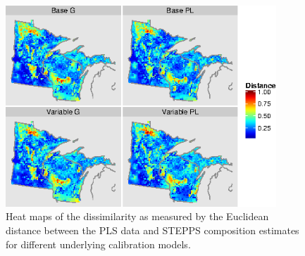 \begin{figure}
\centering
\includegraphics[width=4in]{figures/maps_l2.png}
\caption{Heat maps of the dissimilarity as measured by the Euclidean
  distance between the PLS data and STEPPS composition estimates for
  different underlying calibration models.}
\label{fig:maps_l2}
\end{figure}

